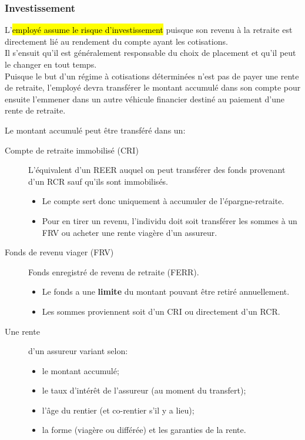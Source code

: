 \documentclass[10pt, french]{article}
\begin{document}
\begin{multicols*}{3}
\subsubsection*{Investissement}

L'\hl{employé assume le risque d'investissement} puisque son revenu à la retraite est directement lié au rendement du compte ayant les cotisations. \\

Il s'ensuit 	qu'il est généralement responsable du choix de placement et qu'il peut le changer en tout temps. \\

Puisque le but d'un régime à cotisations déterminées n'est pas de payer une rente de retraite, l'employé devra transférer le montant accumulé dans son compte pour ensuite l'emmener dans un autre véhicule financier destiné au paiement d'une rente de retraite. 

\begin{definitionNOHFILLsub}
Le montant accumulé peut être transféré dans un:
\begin{description}
	\item[Compte de retraite immobilisé (CRI)]	L'équivalent d'un REER auquel on peut transférer des fonds provenant d'un RCR sauf qu'ils sont immobilisés.
		\begin{itemize}[leftmargin = *]
		\item	Le compte sert donc uniquement à accumuler de l'épargne-retraite.
		\item	Pour en tirer un revenu, l'individu doit soit transférer les sommes à un FRV ou acheter une rente viagère d'un assureur.
		\end{itemize}
	\item[Fonds de revenu viager (FRV)]	Fonds enregistré de revenu de retraite (FERR).
		\begin{itemize}[leftmargin = *]
		\item	Le fonds a une \textbf{limite} du montant pouvant être retiré annuellement.
		\item	Les sommes proviennent soit d'un CRI ou directement d'un RCR.
		\end{itemize}
	\item[Une rente]d'un assureur variant selon:
		\begin{itemize}[leftmargin = *]
		\item	le montant accumulé;
		\item	le taux d'intérêt de l'assureur (au moment du transfert);
		\item	l'âge du rentier (et co-rentier s'il y a lieu);
		\item	la forme (viagère ou différée) et les garanties de la rente.
		\end{itemize}
\end{description}
\end{definitionNOHFILLsub}


\end{multicols*}
\end{document}
